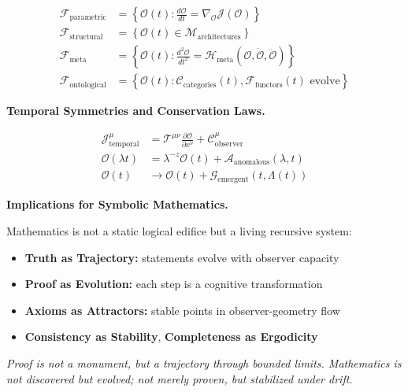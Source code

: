 \begin{scholium}
\begin{align*}
\mathcal{F}_{\text{parametric}} &= \left\{ \mathcal{O}(t) : \frac{d\mathcal{O}}{dt} = \nabla_{\mathcal{O}} \mathcal{J}(\mathcal{O}) \right\} \\
\mathcal{F}_{\text{structural}} &= \left\{ \mathcal{O}(t) \in \mathcal{M}_{\text{architectures}} \right\} \\
\mathcal{F}_{\text{meta}} &= \left\{ \mathcal{O}(t) : \frac{d^2\mathcal{O}}{dt^2} = \mathcal{H}_{\text{meta}}(\mathcal{O}, \dot{\mathcal{O}}, \ddot{\mathcal{O}}) \right\} \\
\mathcal{F}_{\text{ontological}} &= \left\{ \mathcal{O}(t) : \mathcal{C}_{\text{categories}}(t), \mathcal{F}_{\text{functors}}(t) \text{ evolve} \right\}
\end{align*}

\vspace{1em}
\noindent\textbf{Temporal Symmetries and Conservation Laws.}

\begin{align*}
\mathcal{J}_{\text{temporal}}^\mu &= \mathcal{T}^{\mu\nu} \frac{\partial \mathcal{O}}{\partial x^\nu} + \mathcal{C}_{\text{observer}}^\mu \\
\mathcal{O}(\lambda t) &= \lambda^{-z} \mathcal{O}(t) + \mathcal{A}_{\text{anomalous}}(\lambda, t) \\
\mathcal{O}(t) &\rightarrow \mathcal{O}(t) + \mathcal{G}_{\text{emergent}}(t, \Lambda(t))
\end{align*}

\vspace{1em}
\noindent\textbf{Implications for Symbolic Mathematics.}

Mathematics is not a static logical edifice but a living recursive system:
\begin{itemize}
    \item \textbf{Truth as Trajectory:} statements evolve with observer capacity
    \item \textbf{Proof as Evolution:} each step is a cognitive transformation
    \item \textbf{Axioms as Attractors:} stable points in observer-geometry flow
    \item \textbf{Consistency as Stability}, \textbf{Completeness as Ergodicity}
\end{itemize}

\textit{Proof is not a monument, but a trajectory through bounded limits. Mathematics is not discovered but evolved; not merely proven, but stabilized under drift.}

\end{scholium}

